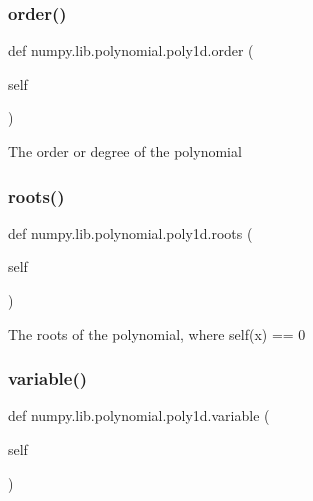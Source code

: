 \subsubsection{\texorpdfstring{order()}{order()}}
{\footnotesize\ttfamily def numpy.\+lib.\+polynomial.\+poly1d.\+order (\begin{DoxyParamCaption}\item[{}]{self }\end{DoxyParamCaption})}

\begin{DoxyVerb}The order or degree of the polynomial \end{DoxyVerb}
 \mbox{\label{classnumpy_1_1lib_1_1polynomial_1_1poly1d_a8880cccbb0a875bf0918d7e9d4928ea1}} 
\subsubsection{\texorpdfstring{roots()}{roots()}}
{\footnotesize\ttfamily def numpy.\+lib.\+polynomial.\+poly1d.\+roots (\begin{DoxyParamCaption}\item[{}]{self }\end{DoxyParamCaption})}

\begin{DoxyVerb}The roots of the polynomial, where self(x) == 0 \end{DoxyVerb}
 \mbox{\label{classnumpy_1_1lib_1_1polynomial_1_1poly1d_a6a2080b2c425d7792621272ea33e3321}} 
\subsubsection{\texorpdfstring{variable()}{variable()}}
{\footnotesize\ttfamily def numpy.\+lib.\+polynomial.\+poly1d.\+variable (\begin{DoxyParamCaption}\item[{}]{self }\end{DoxyParamCaption})}

